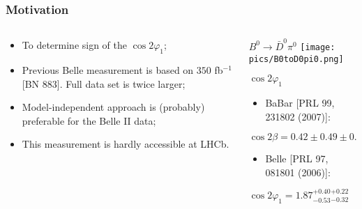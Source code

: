 \documentclass[10 pt,compress,mathserif]{beamer}
\newcommand{\bdpi}{\ensuremath{B^0\to \bar D^0\pi^0}\xspace}
\begin{document}
\begin{frame}
 \frametitle{Motivation}
 \begin{columns}
  \begin{column}{0.5\textwidth}
   \begin{itemize}
    \item To determine sign of the $\cos2\varphi_1$;
    \item Previous Belle measurement is based on $350$ fb${}^{-1}$ [BN 883]. Full data set is twice larger;
    \item Model-independent approach is (probably) preferable for the Belle II data;
    \item This measurement is hardly accessible at LHCb.
   \end{itemize}

  \end{column}
  \begin{column}{0.5\textwidth}
  \begin{block}{\bdpi}
   \texttt{[image: pics/B0toD0pi0.png]}
  \end{block}
  
  \begin{block}{$\cos2\varphi_1$}
   \begin{itemize}
    \item BaBar {\small [PRL 99, 231802 (2007)]}:
   \end{itemize}
  
   $\cos2\beta = 0.42 \pm 0.49 \pm 0.09 \pm 0.13$
   
   \begin{itemize}
    \item Belle {\small [PRL 97, 081801 (2006)]}:
   \end{itemize}

   $\cos2\varphi_1 = 1.87^{+0.40}_{-0.53}{}^{+0.22}_{-0.32}$
  \end{block}

  \end{column}
 \end{columns}
\end{frame}
\end{document}
